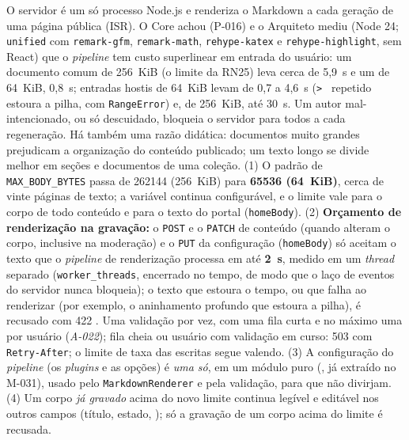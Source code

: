 {O servidor é um só processo Node.js e renderiza o Markdown a cada geração de uma página pública (ISR). O Core achou (P-016) e o Arquiteto mediu (Node 24; \texttt{unified} com \texttt{remark-gfm}, \texttt{remark-math}, \texttt{rehype-katex} e \texttt{rehype-highlight}, sem React) que o \emph{pipeline} tem custo superlinear em entrada do usuário: um documento comum de 256~KiB (o limite da RN25) leva cerca de 5,9~s e um de 64~KiB, 0,8~s; entradas hostis de 64~KiB levam de 0,7 a 4,6~s (\texttt{> } repetido estoura a pilha, com \texttt{RangeError}) e, de 256~KiB, até 30~s. Um autor mal-intencionado, ou só descuidado, bloqueia o servidor para todos a cada regeneração. Há também uma razão didática: documentos muito grandes prejudicam a organização do conteúdo publicado; um texto longo se divide melhor em seções e documentos de uma coleção.}
{(1) O padrão de \texttt{MAX\_BODY\_BYTES} passa de 262144 (256~KiB) para \textbf{65536 (64~KiB)}, cerca de vinte páginas de texto; a variável continua configurável, e o limite vale para o corpo de todo conteúdo e para o texto do portal (\texttt{homeBody}). (2) \textbf{Orçamento de renderização na gravação:} o \texttt{POST} e o \texttt{PATCH} de conteúdo (quando alteram o corpo, inclusive na moderação) e o \texttt{PUT} da configuração (\texttt{homeBody}) só aceitam o texto que o \emph{pipeline} de renderização processa em até \textbf{2~s}, medido em um \emph{thread} separado (\texttt{worker\_threads}, encerrado no tempo, de modo que o laço de eventos do servidor nunca bloqueia); o texto que estoura o tempo, ou que falha ao renderizar (por exemplo, o aninhamento profundo que estoura a pilha), é recusado com 422 . Uma validação por vez, com uma fila curta e no máximo uma por usuário (\emph{A-022}); fila cheia ou usuário com validação em curso: 503  com \texttt{Retry-After}; o limite de taxa das escritas segue valendo. (3) A configuração do \emph{pipeline} (os \emph{plugins} e as opções) é \emph{uma só}, em um módulo puro (, já extraído no M-031), usado pelo \texttt{MarkdownRenderer} e pela validação, para que não divirjam. (4) Um corpo \emph{já gravado} acima do novo limite continua legível e editável nos outros campos (título, estado, ); só a gravação de um corpo acima do limite é recusada.}
